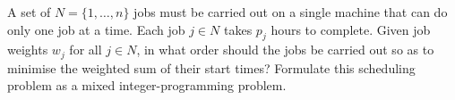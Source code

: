 A set of $N = \{1,\dots,n\}$ jobs must be carried out on a single machine that can do only one job at a time. Each job $j\in N$ takes $p_j$ hours to complete. Given job weights $w_j$ for all $j\in N$, in what order should the jobs be carried out so as to minimise the weighted sum of their start times? Formulate this scheduling problem as a mixed integer-programming problem. 


